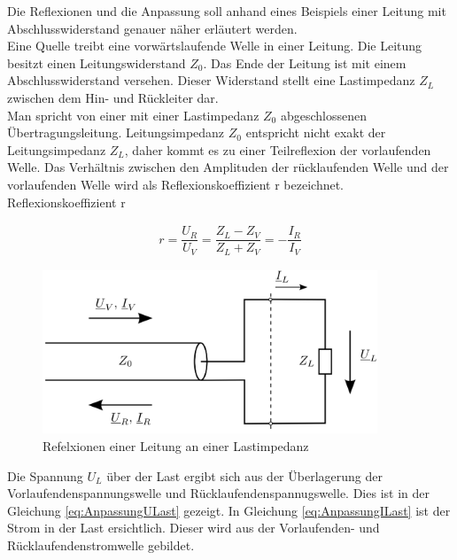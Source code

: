 Die Reflexionen und die Anpassung soll anhand eines Beispiels einer Leitung mit Abschlusswiderstand genauer näher erläutert werden. \\

Eine Quelle treibt eine vorwärtslaufende Welle in einer Leitung. Die Leitung besitzt einen Leitungswiderstand $Z_0$.  Das Ende der Leitung ist mit einem Abschlusswiderstand versehen. Dieser Widerstand stellt eine Lastimpedanz $Z_L$ zwischen dem Hin- und Rückleiter dar. \\
Man spricht von einer mit einer Lastimpedanz $Z_0$ abgeschlossenen Übertragungsleitung. Leitungsimpedanz $Z_0$ entspricht nicht exakt der Leitungsimpedanz $Z_L$, daher kommt es zu einer   Teilreflexion der vorlaufenden Welle. Das Verhältnis zwischen den Amplituden der rücklaufenden Welle und der vorlaufenden Welle wird als Reflexionskoeffizient r bezeichnet. \\

Reflexionskoeffizient r

\begin{eqnarray}\label{eq:Reflexionskoeffizient}
r=\dfrac{U_{R}}{U_{V}}=\dfrac{Z_{L}-Z_{V}}{Z_{L} + Z_{V}}=-\dfrac{I_{R}}{I_{V}}
\end{eqnarray}

\begin{figure}[!h]
	\centering
	\includegraphics[width=10cm]{content/bilder/ReflexionenLeitungLastimpedanz.pdf}%
	\caption{Refelxionen einer Leitung an einer Lastimpedanz \cite{Tekom}}
	\label{FitzDipol}
\end{figure}


Die Spannung $U_L$ über der Last ergibt sich  aus der Überlagerung der Vorlaufendenspannungswelle und  Rücklaufendenspannugswelle. Dies ist in der Gleichung \ref{eq:AnpassungULast} gezeigt. In Gleichung \ref{eq:AnpassungILast} ist der Strom in der Last ersichtlich. Dieser wird aus der Vorlaufenden- und Rücklaufendenstromwelle gebildet.

